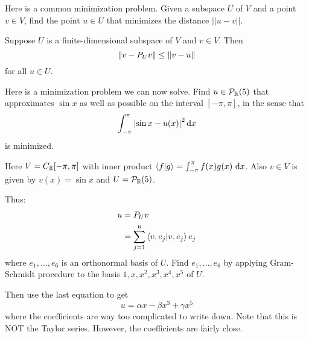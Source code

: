 Here is a common minimization problem.
Given a subspace $U$ of $V$ and a point $v \in V$, find the point $u \in U$ that minimizes the distance
$|| u - v ||$.

\begin{theorem}
    Suppose $U$ is a finite-dimensional subspace of $V$ and $v \in V$. Then
    \[ \norm{v - P_Uv} \leq \norm{v - u} \]
    for all $u \in U$.
\end{theorem}

\begin{example}
    Here is a minimization problem we can now solve. Find $u \in \mathcal{P}_{\operatorname{\mathbb{R}}}(5)$ that approximates
    $\sin x$ as well as possible on the interval $[-\pi, \pi]$, in the sense that
    \[ \int_{-\pi}^{\pi} \abs{\sin x - u(x)}^2 \dd{x} \]
    is minimized.

    Here $V = C_{\operatorname{\mathbb{R}}} [-\pi, \pi]$ with inner product
    $\innerproduct{f}{g} = \int_{-\pi}^{\pi} f(x) g(x) \, \dd{x}$.
    Also $v \in V$ is given by $v(x) = \sin x$ and $U = \mathcal{P}_{\operatorname{\mathbb{R}}}(5)$.

    Thus:
    \begin{align*}
        u &= P_Uv \\
        &= \sum_{j=1}^6 \innerproduct{v, e_j}e_j \\
    \end{align*}
    where $e_1, \dots, e_6$ is an orthonormal basis of $U$.
    Find $e_1, \dots, e_6$ by applying Gram-Schmidt procedure to the basis
    $1, x, x^2, x^3, x^4, x^5$ of $U$.

    Then use the last equation to get
    \[ u = \alpha x - \beta x^3 + \gamma x^5 \]
    where the coefficients are way too complicated to write down. Note that this is NOT
    the Taylor series. However, the coefficients are fairly close.
\end{example}
\endinput